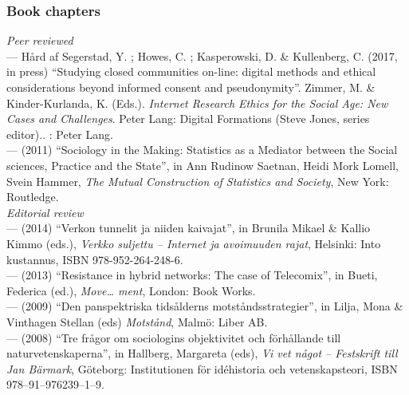 \documentclass[a4paper,11pt,oneside]{article}
\begin{document}
\subsubsection{Book chapters}
  \noindent  \emph{Peer reviewed} \\
  --- Hård af Segerstad, Y. ; Howes, C. ; Kasperowski, D. \& Kullenberg, C. (2017, in press) ``Studying closed communities on-line: digital methods and ethical considerations beyond informed consent and pseudonymity''. Zimmer, M. & Kinder-Kurlanda, K. (Eds.). \emph{Internet Research Ethics for the Social Age: New Cases and Challenges}. Peter Lang: Digital Formations (Steve Jones, series editor).. : Peter Lang. \\
  --- (2011) ``Sociology in the Making: Statistics as a Mediator between the Social sciences, Practice and the State'', in Ann Rudinow Saetnan, Heidi Mork Lomell, Svein Hammer, \emph{The Mutual Construction of Statistics and Society}, New York: Routledge.\\

  \noindent \emph{Editorial review} \\
  --- (2014) ``Verkon tunnelit ja niiden kaivajat'', in Brunila Mikael \& Kallio Kimmo (eds.), \emph{Verkko suljettu – Internet ja avoimuuden rajat}, Helsinki: Into kustannus, ISBN 978-952-264-248-6.\\
  --- (2013) ``Resistance in hybrid networks: The case of Telecomix'', in Bueti, Federica (ed.), \emph{Move… ment}, London: Book Works.\\
  --- (2009) ``Den panspektriska tidsålderns motståndsstrategier'', in Lilja, Mona \& Vinthagen Stellan (eds) \emph{Motstånd}, Malmö: Liber AB.\\
  --- (2008) ``Tre frågor om sociologins objektivitet och förhållande till naturvetenskaperna'', in Hallberg, Margareta (eds), \emph{Vi vet något – Festskrift till Jan Bärmark}, Göteborg: Institutionen för idéhistoria och vetenskapsteori, ISBN 978–91–976239–1–9.\\
\end{document}
